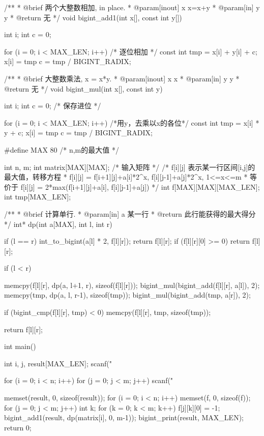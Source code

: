 \begin{Codex}[label=wikioi1166_matrix_game.c]
/**
 * @brief 两个大整数相加, in place.
 * @param[inout] x x=x+y
 * @param[in] y y
 * @return 无
 */
void bigint_add1(int x[], const int y[]) {
    int i;
    int c = 0;

    for (i = 0; i < MAX_LEN; i++) {  /* 逐位相加 */
        const int tmp = x[i] + y[i] + c;
        x[i] = tmp %
        c = tmp / BIGINT_RADIX;
    }
}

/**
 * @brief 大整数乘法, x = x*y.
 * @param[inout] x x
 * @param[in] y y
 * @return 无
 */
void bigint_mul(int x[], const int y) {
    int i;
    int c = 0; /* 保存进位 */

    for (i = 0; i < MAX_LEN; i++) { /*用y，去乘以x的各位*/
        const int tmp = x[i] * y + c;
        x[i] = tmp %
        c = tmp / BIGINT_RADIX;
    }
}


#define MAX 80   /* n,m的最大值 */

int n, m;
int matrix[MAX][MAX];  /* 输入矩阵 */
/* f[i][j] 表示某一行区间[i,j]的最大值，转移方程
 * f[i][j] = f[i+1][j]+a[i]*2^x, f[i][j-1]+a[j]*2^x, 1<=x<=m
 * 等价于 f[i][j] = 2*max(f[i+1][j]+a[i], f[i][j-1]+a[j])
 */
int f[MAX][MAX][MAX_LEN];
int tmp[MAX_LEN];

/**
 * @brief 计算单行.
 * @param[in] a 某一行
 * @return 此行能获得的最大得分
 */
int* dp(int a[MAX], int l, int r) {
    if (l == r) {
        int_to_bigint(a[l] * 2, f[l][r]);
        return f[l][r];
    }
    if (f[l][r][0] >= 0) return f[l][r];

    if (l < r) {
        memcpy(f[l][r], dp(a, l+1, r), sizeof(f[l][r]));
        bigint_mul(bigint_add(f[l][r], a[l]), 2);
        memcpy(tmp, dp(a, l, r-1), sizeof(tmp));
        bigint_mul(bigint_add(tmp, a[r]), 2);

        if (bigint_cmp(f[l][r], tmp) < 0) memcpy(f[l][r], tmp, sizeof(tmp));
    }
    return f[l][r];
}

int main() {
    int i, j, result[MAX_LEN];
    scanf("%

    for (i = 0; i < n; i++) {
        for (j = 0; j < m; j++) {
            scanf("%
        }
    }

    memset(result, 0, sizeof(result));
    for (i = 0; i < n; i++) {
        memset(f, 0, sizeof(f));
        for (j = 0; j < m; j++) {
            int k;
            for (k = 0; k < m; k++) {
                f[j][k][0] = -1;
            }
        }
        bigint_add1(result, dp(matrix[i], 0, m-1));
    }
    bigint_print(result, MAX_LEN);
    return 0;
}
\end{Codex}

